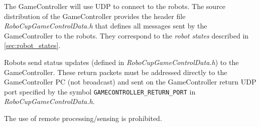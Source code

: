 The GameController will use UDP to connect to the robots. The source distribution of the GameController provides the header file \emph{RoboCupGameControlData.h} that defines all messages sent by the GameController to the robots. They correspond to the \emph{robot states} described in \cref{sec:robot_states}.

Robots send status updates (defined in \emph{RoboCupGameControlData.h}) to the GameController. These return packets must be addressed directly to the GameController PC (\ie not broadcast) and sent on the GameController return UDP port specified by the symbol \verb!GAMECONTROLLER_RETURN_PORT! in \emph{RoboCupGameControlData.h}.

The use of remote processing/sensing is prohibited.
